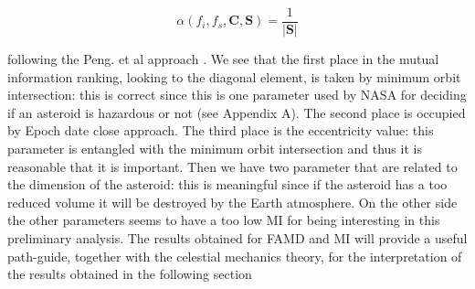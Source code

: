 \documentclass[12pt,%
               a4paper,%
               oneside,openany,%
               titlepage,%
               headinclude,footinclude,%
               BCOR5mm,%
               cleardoublepage=empty,%
               tablecaptionabove,%
               floatperchapter,
               ]{scrreprt}                 %
\begin{document}
\begin{equation}
\alpha(f_{i},f_{s},\textbf{C},\textbf{S})=\dfrac{1}{|\textbf{S}|}
\end{equation}

following the Peng. et al approach \cite{peng2005feature}. We see that the first place in the mutual information ranking, looking to the diagonal element, is taken by minimum orbit intersection: this is correct since this is one parameter used by NASA for deciding if an asteroid is hazardous or not (see Appendix A). The second place is occupied by Epoch date close approach. The third place is the eccentricity value: this parameter is entangled with the minimum orbit intersection and thus it is reasonable that it is important. Then we have two parameter that are related to the dimension of the asteroid: this is meaningful since if the asteroid has a too reduced volume it will be destroyed by the Earth atmosphere. On the other side the other parameters seems to have a too low MI for being interesting in this preliminary analysis. The results obtained for FAMD and MI will provide a useful path-guide, together with the celestial mechanics theory, for the interpretation of the results obtained in the following section 
\end{document}
